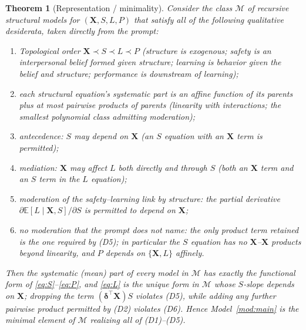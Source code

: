 \documentclass{amsart}
\theoremstyle{definition}
\theoremstyle{plain}
\newtheorem{theorem}{Theorem}
\begin{document}
\begin{theorem}[Representation / minimality]\label{thm:rep}
Consider the class $\mathcal M$ of recursive structural models for $(\bm X,S,L,P)$ that
satisfy all of the following qualitative desiderata, taken directly from the prompt:
\begin{enumerate}
\item[(D1)] \emph{Topological order} $\bm X\prec S\prec L\prec P$ (structure is exogenous;
safety is an interpersonal belief formed given structure; learning is behavior given the
belief and structure; performance is downstream of learning);
\item[(D2)] each structural equation's systematic part is an \emph{affine function of its
parents plus at most pairwise products of parents} (linearity with interactions; the
smallest polynomial class admitting moderation);
\item[(D3)] \emph{antecedence}: $S$ may depend on $\bm X$ (an $S$ equation with an
$\bm X$ term is permitted);
\item[(D4)] \emph{mediation}: $\bm X$ may affect $L$ both directly and through $S$ (both an
$\bm X$ term and an $S$ term in the $L$ equation);
\item[(D5)] \emph{moderation of the safety--learning link by structure}: the partial
derivative $\partial \mathbb E[L\mid\bm X,S]/\partial S$ is permitted to depend on $\bm X$;
\item[(D6)] \emph{no moderation that the prompt does not name}: the only product term
retained is the one required by (D5); in particular the $S$ equation has no $\bm X$--$\bm X$
products beyond linearity, and $P$ depends on $\{\bm X,L\}$ affinely.
\end{enumerate}
Then the systematic (mean) part of every model in $\mathcal M$ has exactly the functional
form of \eqref{eq:S}--\eqref{eq:P}, and \eqref{eq:L} is the unique form in $\mathcal M$ whose
$S$-slope depends on $\bm X$; dropping the term $(\bm\delta^\top\bm X)S$ violates (D5),
while adding any further pairwise product permitted by (D2) violates (D6). Hence
Model~\ref{mod:main} is the minimal element of $\mathcal M$ realizing all of (D1)--(D5).
\end{theorem}
\end{document}
